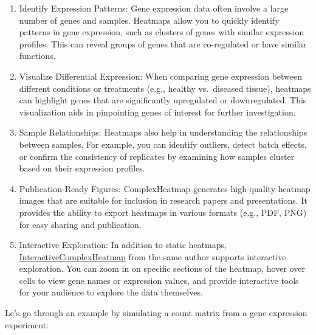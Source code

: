 \documentclass[
]{book}
\begin{document}
\begin{enumerate}
\def\labelenumi{\arabic{enumi}.}
\item
  Identify Expression Patterns: Gene expression data often involve a large number of genes and samples. Heatmaps allow you to quickly identify patterns in gene expression, such as clusters of genes with similar expression profiles. This can reveal groups of genes that are co-regulated or have similar functions.
\item
  Visualize Differential Expression: When comparing gene expression between different conditions or treatments (e.g., healthy vs.~diseased tissue), heatmaps can highlight genes that are significantly upregulated or downregulated. This visualization aids in pinpointing genes of interest for further investigation.
\item
  Sample Relationships: Heatmaps also help in understanding the relationships between samples. For example, you can identify outliers, detect batch effects, or confirm the consistency of replicates by examining how samples cluster based on their expression profiles.
\item
  Publication-Ready Figures: ComplexHeatmap generates high-quality heatmap images that are suitable for inclusion in research papers and presentations. It provides the ability to export heatmaps in various formats (e.g., PDF, PNG) for easy sharing and publication.
\item
  Interactive Exploration: In addition to static heatmaps, \href{https://www.bioconductor.org/packages/release/bioc/html/InteractiveComplexHeatmap.html}{InteractiveComplexHeatmap} from the same author supports interactive exploration. You can zoom in on specific sections of the heatmap, hover over cells to view gene names or expression values, and provide interactive tools for your audience to explore the data themselves.
\end{enumerate}

Le's go through an example by simulating a count matrix from a gene expression experiment:
\end{document}

